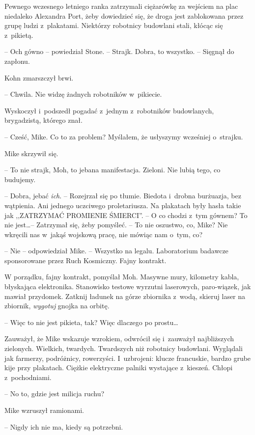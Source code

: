 \documentclass[oneside,polish,11pt,sfheadings]{mwbk}
\begin{document}
Pewnego wczesnego letniego ranka zatrzymali ciężarówkę za wejściem na
plac niedaleko Alexandra Port, żeby dowiedzieć się, że droga jest
zablokowana przez grupę ludzi z~plakatami. Niektórzy robotnicy budowlani
stali, kłócąc się z~pikietą.

-- Och gówno -- powiedział Stone. -- Strajk. Dobra, to wszystko. -- Sięgnął
do zapłonu.

Kohn zmarszczył brwi. 

-- Chwila. Nie widzę żadnych robotników w~pikiecie.

Wyskoczył i~podszedł pogadać z~jednym z~robotników budowlanych,
brygadzistą, którego znał.

-- Cześć, Mike. Co to za problem? Myślałem, że usłyszymy wcześniej o~strajku.

Mike skrzywił się. 

-- To nie strajk, Moh, to jebana manifestacja.
Zieloni. Nie lubią tego, co budujemy.

-- Dobra, jebać \emph{ich}. -- Rozejrzał się po tłumie. Biedota i~drobna
burżuazja, bez wątpienia. Ani jednego uczciwego proletariusza. Na
plakatach były hasła takie jak ,,ZATRZYMAĆ PROMIENIE ŚMIERCI''. -- O co
chodzi z~tym gównem? To nie jest\ldots -- Zatrzymał się, żeby pomyśleć. -- To
nie oszustwo, co, Mike? Nie wkręcili nas w~jakąś wojskową pracę, nie
mówiąc nam o~tym, co?

-- Nie -- odpowiedział Mike. -- Wszystko na legalu. Laboratorium badawcze
sponsorowane przez Ruch Kosmiczny. Fajny kontrakt.

W porządku, fajny kontrakt, pomyślał Moh. Masywne mury, kilometry kabla,
błyskająca elektronika. Stanowisko testowe wyrzutni laserowych,
paro-wiązek, jak mawiał przydomek. Zatknij ładunek na górze zbiornika z~wodą, skieruj laser na zbiornik, \emph{wygotuj} gnojka na orbitę.

-- Więc to nie jest pikieta, tak? Więc dlaczego po prostu\ldots

Zauważył, że Mike wskazuje wzrokiem, odwrócił się i~zauważył
najbliższych zielonych. Wielkich, twardych. Twardszych niż robotnicy
budowlani. Wyglądali jak farmerzy, podróżnicy, rowerzyści. I~uzbrojeni:
klucze francuskie, bardzo grube kije przy plakatach. Ciężkie elektryczne
palniki wystające z~kieszeń. Chłopi z~pochodniami.

-- No to, gdzie jest milicja ruchu?

Mike wzruszył ramionami. 

-- Nigdy ich nie ma, kiedy są potrzebni.
\end{document}
